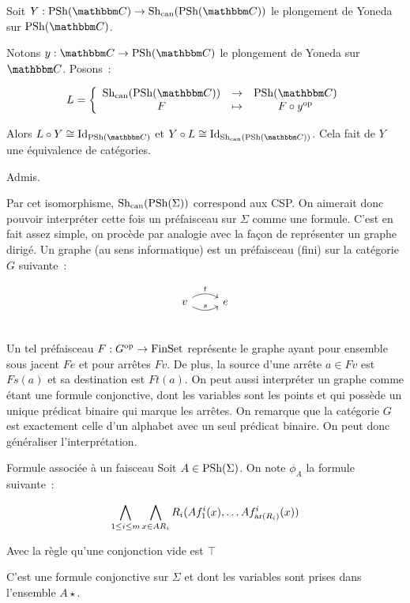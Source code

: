 \begin{prop}\label{canEq}
    Soit $Y : \psh(\C)\rightarrow\shc(\psh(\C))$ le plongement de Yoneda sur
    $\psh(\C)$.

    Notons $y : \C\rightarrow\psh(\C)$ le plongement de Yoneda sur $\C$. Posons~:

    \[L = \left\{\begin{array}{ccc}
             \shc(\psh(\C)) & \rightarrow & \psh(\C) \\
             F              & \mapsto     & F\circ y^\text{op} \\
    \end{array}\right.\]

    Alors $L\circ Y\cong\text{Id}_{\psh(\C)}$ et
    $Y\circ L\cong\text{Id}_{\shc(\psh(\C))}$. Cela fait de $Y$ une équivalence de
    catégories.
\end{prop}

\begin{pv}
    Admis.
\end{pv}

Par cet isomorphisme, $\text{Sh}_\text{can}(\text{PSh}(\Sigma))$ correspond aux CSP. On aimerait donc pouvoir
interpréter cette fois un préfaisceau sur $\Sigma$ comme une formule. C'est en fait assez
simple, on procède par analogie avec la façon de représenter un graphe dirigé. Un graphe
(au sens informatique) est un préfaisceau (fini) sur la catégorie $G$ suivante~:

\[\begin{tikzcd}
    v \arrow[r, bend right, "s"] \arrow[r, bend left, "t"] & e \\
\end{tikzcd}\]

Un tel préfaisceau $F : G^{\text{op}}\rightarrow\text{FinSet}$ représente le graphe ayant pour
ensemble sous jacent $Fe$ et pour arrêtes $Fv$. De plus, la source d'une arrête $a\in Fv$
est $Fs(a)$ et sa destination est $Ft(a)$. On peut aussi interpréter un graphe comme
étant une formule conjonctive, dont les variables sont les points et qui possède un
unique prédicat binaire qui marque les arrêtes. On remarque que la catégorie $G$ est
exactement celle d'un alphabet avec un seul prédicat binaire. On peut donc généraliser
l'interprétation.

\begin{defi}{Formule associée à un faisceau}
    Soit $A\in\text{PSh}(\Sigma)$. On note $\phi_A$ la formule suivante~:
    
    \[\bigwedge_{1\leq i\leq m} \bigwedge_{x\in AR_i}
            R_i(Af_1^i(x), \dots Af_{\text{ar}(R_i)}^i(x)) \]

    Avec la règle qu'une conjonction vide est $\top$

    C'est une formule conjonctive sur $\Sigma$ et dont les variables sont prises dans
    l'ensemble $A\star$.
\end{defi}

